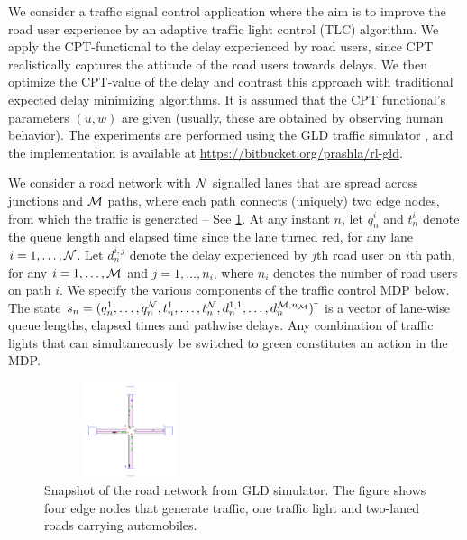 We consider a traffic signal control application where the aim is to improve the road user experience by an adaptive traffic light control (TLC) algorithm.
We apply the CPT-functional to the delay experienced by road users, since CPT realistically captures the attitude of the road users towards delays. We then optimize the CPT-value of the delay and contrast this approach with traditional expected delay minimizing algorithms. It is assumed that the CPT functional's parameters $(u,w)$ are given (usually, these are obtained by observing human behavior). The experiments are performed using the GLD traffic simulator \cite{GLDSim}, and the implementation is available at \url{https://bitbucket.org/prashla/rl-gld}.

We consider a road network with $\mathcal{N}$ signalled lanes that are spread across junctions and $\mathcal{M}$ paths, where each path connects (uniquely) two edge nodes, from which the traffic is generated -- See \cref{fig:road-net}. 
At any instant $n$, let $q_n^i$ and $t_n^i$ denote the queue length and elapsed time since the lane turned red, for any lane $i = 1,\ldots, \mathcal{N}$. Let $d_n^{i,j}$ denote the delay experienced by $j$th road user on $i$th path, for any $i=1,\ldots,\mathcal{M}$ and $j=1,\ldots,n_i$, where $n_i$ denotes the number of road users on path $i$.
We specify the various components of the traffic control MDP below.
The state $s_n=(q_n^1,\ldots,q_n^{\mathcal{N}},t_n^1,\ldots,t_n^{\mathcal{N}},d_n^{1,1},\ldots,d_n^{\mathcal{M},n_{\mathcal{M}}})^\mathsf{\scriptscriptstyle T}$ is a vector of lane-wise queue lengths, elapsed times and pathwise delays. Any combination of traffic lights that can simultaneously be switched to green constitutes an action in the MDP.

 \begin{figure}
    \centering
        \includegraphics[width=2in,height=1.1in]{fig/road-net.png}
\caption{Snapshot of the road network from GLD simulator. The figure shows four edge nodes that generate traffic, one traffic light and  two-laned roads carrying automobiles.}
\label{fig:road-net}
\end{figure}




